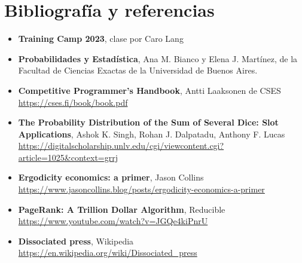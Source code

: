 \documentclass[../main.tex]{subfiles}
\begin{document}
\section{Bibliografía y referencias}

\begin{itemize}
  \item \textbf{Training Camp 2023}, clase por Caro Lang \\
  \item \textbf{Probabilidades y Estadística}, Ana M. Bianco y Elena J. Martínez, de la Facultad de Ciencias Exactas de la Universidad de Buenos Aires.
  \item \textbf{Competitive Programmer's Handbook}, Antti Laaksonen de CSES \\
    \href{https://cses.fi/book/book.pdf}{https://cses.fi/book/book.pdf}
  \item \textbf{The Probability Distribution of the Sum of Several Dice: Slot Applications}, Ashok K. Singh, Rohan J. Dalpatadu, Anthony F. Lucas \\
    \href{https://digitalscholarship.unlv.edu/cgi/viewcontent.cgi?article=1025&context=grrj}{https://digitalscholarship.unlv.edu/cgi/viewcontent.cgi?article=1025\&context=grrj}
  \item \textbf{Ergodicity economics: a primer}, Jason Collins \\
    \href{https://www.jasoncollins.blog/posts/ergodicity-economics-a-primer}{https://www.jasoncollins.blog/posts/ergodicity-economics-a-primer}
  \item \textbf{PageRank: A Trillion Dollar Algorithm}, Reducible \\
    \href{https://www.youtube.com/watch?v=JGQe4kiPnrU}{https://www.youtube.com/watch?v=JGQe4kiPnrU}
  \item \textbf{Dissociated press}, Wikipedia \\
    \href{https://en.wikipedia.org/wiki/Dissociated_press}{https://en.wikipedia.org/wiki/Dissociated\_press}
\end{itemize}
\end{document}
